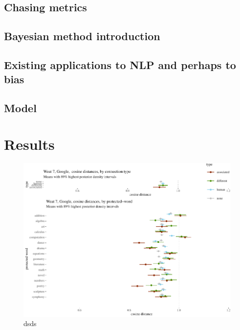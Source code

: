 \documentclass[
  10pt,
  dvipsnames,enabledeprecatedfontcommands]{scrartcl}
\begin{document}
\hypertarget{chasing-metrics}{%
\subsection{Chasing metrics}\label{chasing-metrics}}

\hypertarget{bayesian-method-introduction}{%
\subsection{Bayesian method
introduction}\label{bayesian-method-introduction}}

\hypertarget{existing-applications-to-nlp-and-perhaps-to-bias}{%
\subsection{Existing applications to NLP and perhaps to
bias}\label{existing-applications-to-nlp-and-perhaps-to-bias}}

\hypertarget{model}{%
\subsection{Model}\label{model}}

\hypertarget{results}{%
\section{Results}\label{results}}

\vspace{1mm}
\footnotesize

\begin{figure}


\begin{center}\includegraphics[width=1.1\linewidth]{paperDraft4_files/figure-latex/unnamed-chunk-1-1} \end{center}
\caption{dsds}
\label{fig:weat7google}
\end{figure}
\end{document}
